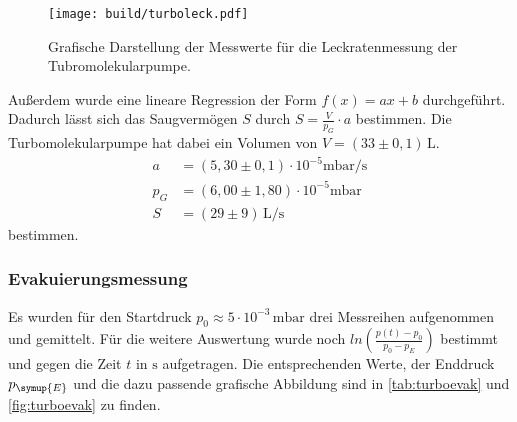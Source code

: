 \begin{figure}[H]
  \centering
  \texttt{[image: build/turboleck.pdf]}
  \caption{Grafische Darstellung der Messwerte für die Leckratenmessung der Tubromolekularpumpe.}
  \label{fig:turboleck}
\end{figure}
Außerdem wurde eine lineare Regression der Form $f(x) = ax +b$ durchgeführt. Dadurch lässt sich das Saugvermögen
$S$ durch $S = \frac{V}{p_G}\cdot a$ bestimmen. Die Turbomolekularpumpe hat dabei ein Volumen von
$V = (33 \pm 0,1) \,\si{\liter}$. 
\begin{align*}
  a &= (5,30 \pm 0,1)\cdot 10^{-5} \si{\milli\bar\per\second} \\
  p_G &= (6,00 \pm 1,80) \cdot 10^{-5} \si{\milli\bar} \\
  S &= (29 \pm 9)\,\si{\liter\per\second}
\end{align*}
bestimmen.

\subsubsection{Evakuierungsmessung}
Es wurden für den Startdruck $p_{0} \approx 5\cdot 10^{-3}\,\si{\milli\bar}$ drei Messreihen aufgenommen und
gemittelt. Für die weitere Auswertung wurde noch $ln(\frac{p(t)-p_0}{p_0 - p_E})$ bestimmt und gegen die Zeit
$t$ in $\si{\second}$ aufgetragen. Die entsprechenden Werte, der Enddruck $p_{\symup{E}}$ und die dazu passende
grafische Abbildung sind in \autoref{tab:turboevak} und \autoref{fig:turboevak} zu finden.

